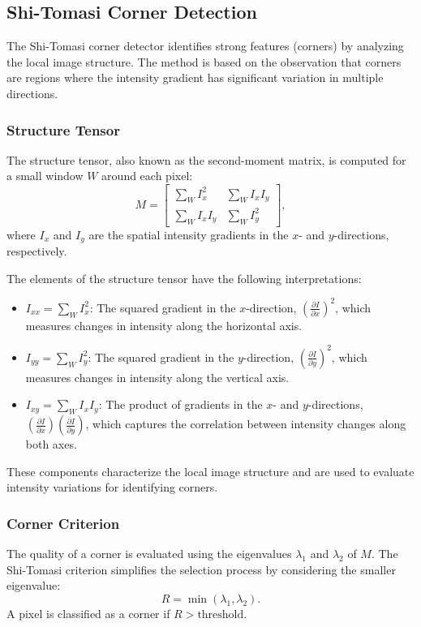 \documentclass[11pt, conference, letterpaper]{IEEEtran}
\begin{document}

\subsection{Shi-Tomasi Corner Detection}
The Shi-Tomasi corner detector identifies strong features (corners) by analyzing the local image structure. The method is based on the observation that corners are regions where the intensity gradient has significant variation in multiple directions.

\subsubsection{Structure Tensor}
The structure tensor, also known as the second-moment matrix, is computed for a small window \(W\) around each pixel:
\begin{equation}
M = \begin{bmatrix}
\sum_W I_x^2 & \sum_W I_x I_y \\
\sum_W I_x I_y & \sum_W I_y^2
\end{bmatrix},
\end{equation}
where \(I_x\) and \(I_y\) are the spatial intensity gradients in the \(x\)- and \(y\)-directions, respectively.

The elements of the structure tensor have the following interpretations:
\begin{itemize}
    \item \(I_{xx} = \sum_W I_x^2\): The squared gradient in the \(x\)-direction, \((\frac{\partial I}{\partial x})^2\), which measures changes in intensity along the horizontal axis.
    \item \(I_{yy} = \sum_W I_y^2\): The squared gradient in the \(y\)-direction, \((\frac{\partial I}{\partial y})^2\), which measures changes in intensity along the vertical axis.
    \item \(I_{xy} = \sum_W I_x I_y\): The product of gradients in the \(x\)- and \(y\)-directions, \((\frac{\partial I}{\partial x})(\frac{\partial I}{\partial y})\), which captures the correlation between intensity changes along both axes.
\end{itemize}

These components characterize the local image structure and are used to evaluate intensity variations for identifying corners.
\bigskip


\subsubsection{Corner Criterion}
The quality of a corner is evaluated using the eigenvalues \(\lambda_1\) and \(\lambda_2\) of \(M\). The Shi-Tomasi criterion simplifies the selection process by considering the smaller eigenvalue:
\begin{equation}
R = \min(\lambda_1, \lambda_2).
\end{equation}
A pixel is classified as a corner if \(R > \text{threshold}\).
\bigskip
\end{document}

